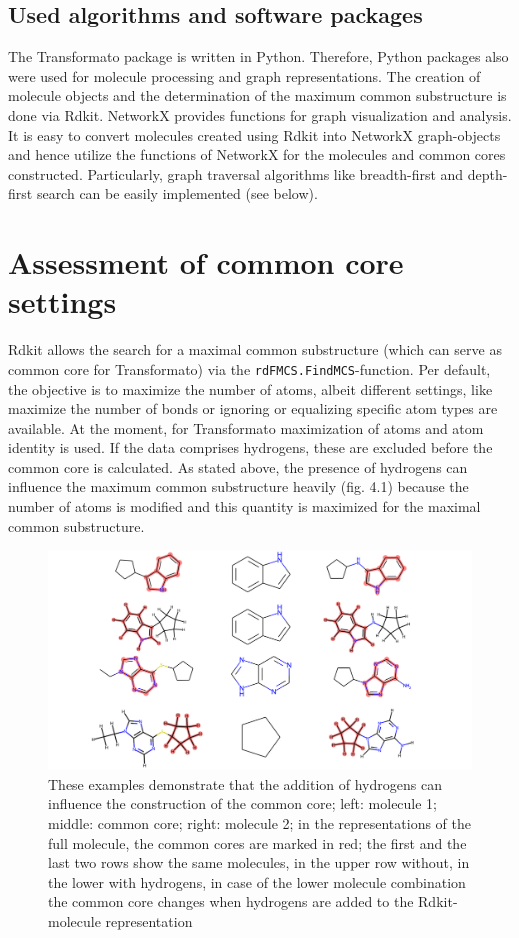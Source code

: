 \subsection{Used algorithms and software packages}

The Transformato package is written in Python. Therefore, Python packages
also were used for molecule processing and graph representations.
The creation of molecule objects and the determination of the maximum
common substructure is done via Rdkit\cite{key-3}. NetworkX\cite{AricA.Hagberg.2008}
provides functions for graph visualization and analysis. It is easy to convert molecules created using Rdkit into NetworkX graph-objects
and hence utilize the functions of NetworkX for the molecules and
common cores constructed. Particularly, graph traversal algorithms
like breadth-first and depth-first search can be easily implemented
(see below).

\section{Assessment of common core settings}

Rdkit allows the search for a maximal common substructure (which can
serve as common core for Transformato) via the \texttt{rdFMCS.FindMCS}-function.
Per default, the objective is to maximize the number of atoms, albeit
different settings, like maximize the number of bonds or ignoring
or equalizing specific atom types are available. At the moment, for
Transformato maximization of atoms and atom identity is used. If the
data comprises hydrogens, these are excluded before the common core
is calculated. As stated above, the presence of hydrogens can influence
the maximum common substructure heavily (fig. 4.1) because the number of atoms is modified and this quantity is maximized for the maximal common substructure.

\begin{figure}

\includegraphics[scale=0.3]{hydrogens_plus_minus}\caption{These examples demonstrate that the addition of hydrogens can influence the construction of the common core; left: molecule 1; middle: common core; right: molecule 2; in the representations of the full molecule, the common cores are marked in red; the first
and the last two rows show the same molecules, in the upper row without,
in the lower with hydrogens, in case of the lower molecule combination
the common core changes when hydrogens are added to the Rdkit-molecule
representation }

\end{figure}

